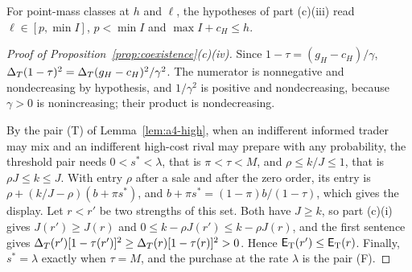 For point-mass classes at \(h\) and \(\ell\), the hypotheses of part (c)(iii) read \(\ell\in[p,\min I]\),
\(p<\min I\) and \(\max I+c_H\le h\).

\begin{proof}[Proof of Proposition~\ref{prop:coexistence}(c)(iv)]
Since \(1-\tau=(g_H-c_H)/\gamma\), \(\Delta_T(1-\tau)^2=\Delta_T(g_H-c_H)^2/\gamma^2\). The numerator is nonnegative and
nondecreasing by hypothesis, and \(1/\gamma^2\) is positive and nondecreasing, because \(\gamma>0\) is nonincreasing;
their product is nondecreasing.

By the pair (T) of Lemma~\ref{lem:a4-high}, when an indifferent informed trader may mix and an indifferent high-cost
rival may prepare with any probability, the threshold pair needs \(0<s^*<\lambda\), that is \(\pi<\tau<M\), and
\(\rho\le k/J\le1\), that is \(\rho J\le k\le J\). With entry \(\rho\) after a sale and after the zero order, its entry is
\(\rho+(k/J-\rho)(b+\pi s^*)\), and \(b+\pi s^*=(1-\pi)b/(1-\tau)\), which gives the display. Let \(r<r'\) be two
strengths of this set. Both have \(J\ge k\), so part (c)(i) gives \(J(r')\ge J(r)\) and
\(0\le k-\rho J(r')\le k-\rho J(r)\), and the first sentence gives \(\Delta_T(r')[1-\tau(r')]^2\ge\Delta_T(r)[1-\tau(r)]^2>0\).
Hence \(\mathsf{E}_{\rm T}(r')\le\mathsf{E}_{\rm T}(r)\). Finally, \(s^*=\lambda\) exactly when \(\tau=M\), and the purchase at the
rate \(\lambda\) is the pair (F).
\end{proof}

